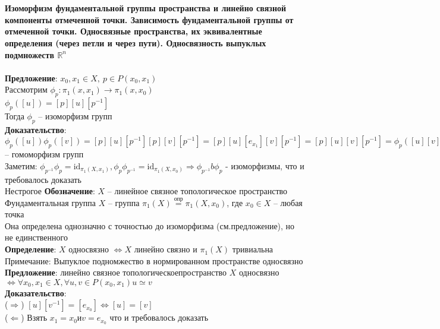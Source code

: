 	\section{}
	\textbf{Изоморфизм фундаментальной группы пространства и линейно связной компоненты отмеченной точки. Зависимость фундаментальной группы от отмеченной точки. Односвязные пространства, их эквивалентные определения (через петли и через пути). Односвязность выпуклых подмножеств $\mathbb{R}^n$}\\
	\\
	\textbf{Предложение}: $x_0, x_1 \in X,\ p\in P(x_0, x_1)$\\
	Рассмотрим ${\phi}_p: {\pi}_1(x, x_1) \rightarrow {\pi}_1(x,x_0)$\\
	${\phi}_p ([u]) = [p][u][p^{-1}]$\\
	Тогда ${\phi}_p$ -- изоморфизм групп\\
	\textbf{Доказательство}: ${\phi}_p ([u]) {\phi}_p ([v]) = [p][u][p^{-1}][p][v][p^{-1}] = [p][u][e_{x_1}][v][p^{-1}] = [p][u][v][p^{-1}] = {\phi}_p ([u][v]) \Rightarrow {\phi}_p$ -- гомоморфизм групп\\
	Заметим: ${\phi}_{p^{-1}} {\phi}_p =  \text{id}_{{\pi}_1 (X, x_1)}, {\phi}_p {\phi}_{p^{-1}} =  \text{id}_{{\pi}_1 (X, x_0)} \Rightarrow {\phi}_{p^{-1}} b {\phi}_p$ - изоморфизмы, что и требовалось доказать\\
	Нестрогое \textbf{Обозначение}: $X$ -- линейное связное топологическое пространство\\
	Фундаментальная группа $X$ -- группа ${\pi}_1 (X) \overset{опр}{ = } {\pi}_1 (X, x_0)$, где $x_0 \in X$ -- любая точка\\
	Она определена однозначно с точностью до изоморфизма (см.предложение), но не единственного\\
	\textbf{Определение}: $X$ односвязно $\Leftrightarrow X$ линейно связно и ${\pi}_1 (X)$ тривиальна\\
	Примечание: Выпуклое подномжество в нормированном пространстве односвязно\\
	\textbf{Предложение}: линейно связное топологическоепространство $X$ односвязно $\Leftrightarrow \forall x_0, x_1 \in X, \forall u, v \in P(x_0,x_1) u\simeq v$\\
	\textbf{Доказательство}:\\
	($\Rightarrow$) $[u][v^{-1}] = [e_{x_0}] \Leftrightarrow [u] = [v]$\\
	($\Leftarrow$) Взять $x_1 = x_0 и v = e_{x_0}$ что и требовалось доказать
	
	


